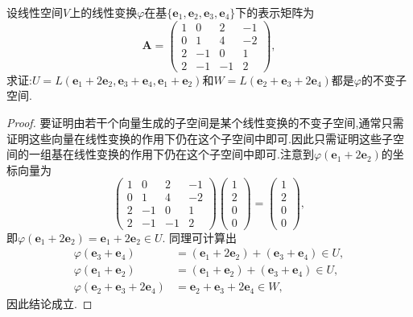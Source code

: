 \documentclass[lang=cn,newtx,10pt,scheme=chinese]{elegantbook}
\begin{document}
\begin{example}
设线性空间\(V\)上的线性变换\(\varphi\)在基\(\{\boldsymbol{e}_1,\boldsymbol{e}_2,\boldsymbol{e}_3,\boldsymbol{e}_4\}\)下的表示矩阵为
\[
\boldsymbol{A}=\begin{pmatrix}
1&0&2&-1\\
0&1&4&-2\\
2&-1&0&1\\
2&-1&-1&2
\end{pmatrix},
\]
求证:\(U = L(\boldsymbol{e}_1 + 2\boldsymbol{e}_2,\boldsymbol{e}_3 + \boldsymbol{e}_4,\boldsymbol{e}_1 + \boldsymbol{e}_2)\)和\(W = L(\boldsymbol{e}_2 + \boldsymbol{e}_3 + 2\boldsymbol{e}_4)\)都是\(\varphi\)的不变子空间.
\end{example}
\begin{proof}
    要证明由若干个向量生成的子空间是某个线性变换的不变子空间,通常只需证明这些向量在线性变换的作用下仍在这个子空间中即可.因此只需证明这些子空间的一组基在线性变换的作用下仍在这个子空间中即可.注意到\(\varphi(\boldsymbol{e}_1 + 2\boldsymbol{e}_2)\)的坐标向量为
\[
\begin{pmatrix}
1&0&2&-1\\
0&1&4&-2\\
2&-1&0&1\\
2&-1&-1&2
\end{pmatrix}
\begin{pmatrix}
1\\
2\\
0\\
0
\end{pmatrix}=
\begin{pmatrix}
1\\
2\\
0\\
0
\end{pmatrix},
\]
即\(\varphi(\boldsymbol{e}_1 + 2\boldsymbol{e}_2)=\boldsymbol{e}_1 + 2\boldsymbol{e}_2\in U\). 同理可计算出
\begin{align*}
\varphi(\boldsymbol{e}_3 + \boldsymbol{e}_4)&=(\boldsymbol{e}_1 + 2\boldsymbol{e}_2)+(\boldsymbol{e}_3 + \boldsymbol{e}_4)\in U,\\
\varphi(\boldsymbol{e}_1 + \boldsymbol{e}_2)&=(\boldsymbol{e}_1 + \boldsymbol{e}_2)+(\boldsymbol{e}_3 + \boldsymbol{e}_4)\in U,\\
\varphi(\boldsymbol{e}_2 + \boldsymbol{e}_3 + 2\boldsymbol{e}_4)&=\boldsymbol{e}_2 + \boldsymbol{e}_3 + 2\boldsymbol{e}_4\in W,
\end{align*}
因此结论成立. 
\end{proof}
\end{document}
